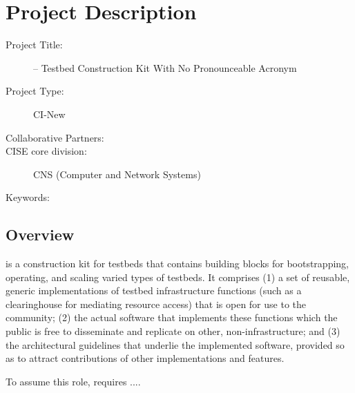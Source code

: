 
\section{Project Description}


\begin{description}
  \item[Project Title:] \sysname -- Testbed Construction Kit With No Pronounceable Acronym
  \item[Project Type:] CI-New 
  \item[Collaborative Partners:] 
  \item[CISE core division:] CNS (Computer and Network Systems)
  \item[Keywords:] 
\end{description}


\subsection{Overview}

\sysname is a construction kit for testbeds that contains building 
blocks for bootstrapping, operating, and scaling varied types of testbeds.
It comprises (1) a set of reusable, generic implementations of testbed
infrastructure functions (such as a clearinghouse for mediating resource
access) that is open for use to the community; (2) the actual software
that implements these functions which the public
is free to disseminate
and replicate on other, non-\sysname infrastructure; and (3) the
architectural guidelines that underlie the implemented software,
provided so as to attract contributions of other implementations and
features.

To assume this role, \sysname requires ....


